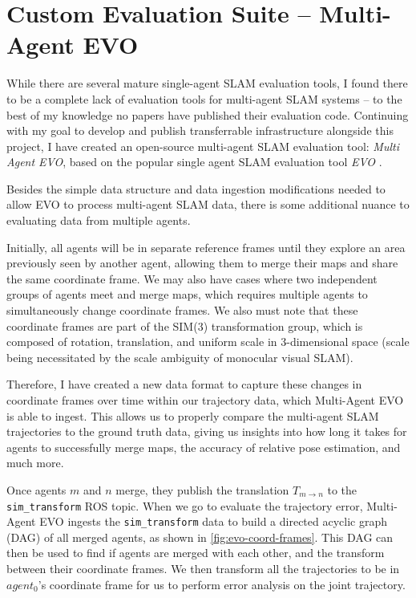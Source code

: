 \section{Custom Evaluation Suite – Multi-Agent EVO}
\label{sec:multi-agent-evo}
While there are several mature single-agent SLAM evaluation tools, I found there to be a complete lack of evaluation tools for multi-agent SLAM systems – to the best of my knowledge no papers have published their evaluation code. Continuing with my goal to develop and publish transferrable infrastructure alongside this project, I have created an open-source multi-agent SLAM evaluation tool: \textit{Multi Agent EVO}, based on the popular single agent SLAM evaluation tool \textit{EVO} \autocite{grupp2017evo}.

Besides the simple data structure and data ingestion modifications needed to allow EVO to process multi-agent SLAM data, there is some additional nuance to evaluating data from multiple agents.

Initially, all agents will be in separate reference frames until they explore an area previously seen by another agent, allowing them to merge their maps and share the same coordinate frame. We may also have cases where two independent groups of agents meet and merge maps, which requires multiple agents to simultaneously change coordinate frames. We also must note that these coordinate frames are part of the SIM(3) transformation group, which is composed of rotation, translation, and uniform scale in 3-dimensional space (scale being necessitated by the scale ambiguity of monocular visual SLAM).

Therefore, I have created a new data format to capture these changes in coordinate frames over time within our trajectory data, which Multi-Agent EVO is able to ingest. This allows us to properly compare the multi-agent SLAM trajectories to the ground truth data, giving us insights into how long it takes for agents to successfully merge maps, the accuracy of relative pose estimation, and much more.

Once agents $m$ and $n$ merge, they publish the translation $T_{m \to n}$ to the \texttt{sim\_transform} ROS topic. When we go to evaluate the trajectory error, Multi-Agent EVO ingests the \texttt{sim\_transform} data to build a directed acyclic graph (DAG) of all merged agents, as shown in \autoref{fig:evo-coord-frames}. This DAG can then be used to find if agents are merged with each other, and the transform between their coordinate frames. We then transform all the trajectories to be in $agent_0$'s coordinate frame for us to perform error analysis on the joint trajectory.

